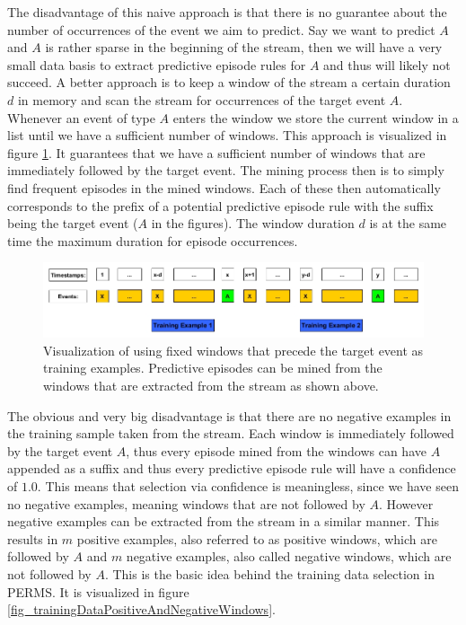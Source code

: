The disadvantage of this naive approach is that there is no guarantee about the number of occurrences of the event we aim to predict. Say we want to predict $A$ and $A$ is rather sparse in the beginning of the stream, then we will have a very small data basis to extract predictive episode rules for $A$ and thus will likely not succeed. 
A better approach is to keep a window of the stream a certain duration $d$ in memory and scan the stream for occurrences of the target event $A$. Whenever an event of type $A$ enters the window we store the current window in a list until we have a sufficient number of windows. This approach is visualized in figure \ref{fig_trainingDataWindowsOfA}. It guarantees that we have a sufficient number of windows that are immediately followed by the target event. The mining process then is to simply find frequent episodes in the mined windows. Each of these then automatically corresponds to the prefix of a potential predictive episode rule with the suffix being the target event ($A$ in the figures). The window duration $d$ is at the same time the maximum duration for episode occurrences.

\begin{figure}[h]
	\centering
  	\includegraphics[width=\textwidth]{trainingDataWindowsOfA}
	\caption{Visualization of using fixed windows that precede the target event as training examples. Predictive episodes can be mined from the windows that are extracted from the stream as shown above.}
	\label{fig_trainingDataWindowsOfA}
\end{figure}

The obvious and very big disadvantage is that there are no negative examples in the training sample taken from the stream. Each window is immediately followed by the target event $A$, thus every episode mined from the windows can have $A$ appended as a suffix and thus every predictive episode rule will have a confidence of $1.0$. This means that selection via confidence is meaningless, since we have seen no negative examples, meaning windows that are not followed by $A$. However negative examples can be extracted from the stream in a similar manner. This results in $m$ positive examples, also referred to as positive windows, which are followed by $A$ and $m$ negative examples, also called negative windows, which are not followed by $A$. This is the basic idea behind the training data selection in PERMS. It is visualized in figure \ref{fig_trainingDataPositiveAndNegativeWindows}. 

